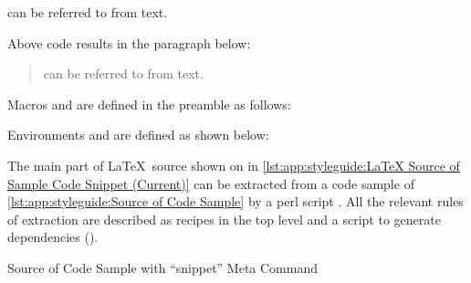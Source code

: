 \begin{VerbatimU}
\begin{fcvref}[ln:base1]
 can be referred
to from text.
\end{fcvref}
\end{VerbatimU}

Above code results in the paragraph below:

\begin{quote}
\begin{fcvref}[ln:base1]
 can be referred
to from text.
\end{fcvref}
\end{quote}

Macros \qco{\\lnlbl\{\}} and \qco{\\lnref\{\}} are defined in
the preamble as follows:

\begin{VerbatimU}
\newcommand{\lnlblbase}{}
\newcommand{\lnlbl}[1]{%
  \phantomsection\label{\lnlblbase:#1}}
\newcommand{\lnrefbase}{}
\newcommand{\lnref}[1]{\ref{\lnrefbase:#1}}
\end{VerbatimU}

Environments  and  are defined as
shown below:

\begin{VerbatimU}
\newenvironment{fcvlabel}[1][]{%
  \renewcommand{\lnlblbase}{#1}%
  \ignorespaces}{\ignorespacesafterend}
\newenvironment{fcvref}[1][]{%
  \renewcommand{\lnrefbase}{#1}%
  \ignorespaces}{\ignorespacesafterend}
\end{VerbatimU}

\begin{fcvref}
The main part of \LaTeX\ source shown on
 in
\cref{lst:app:styleguide:LaTeX Source of Sample Code Snippet (Current)}
can be extracted from a code sample of
\cref{lst:app:styleguide:Source of Code Sample} by a perl script
.
All the relevant rules of extraction are described as recipes in the
top level  and a script to generate dependencies
().
\end{fcvref}

\begin{listing*}
\vspace*{-9pt}
\caption{Source of Code Sample with ``snippet'' Meta Command}
\label{lst:app:styleguide:Source of Code Sample}
\end{listing*}

